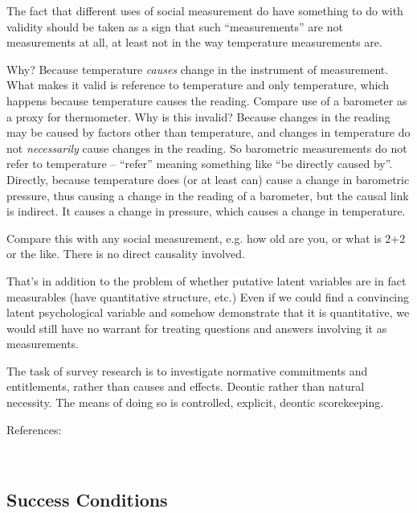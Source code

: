 \documentclass[11pt,twoside]{article}
\newcommand{\sr}{survey research}
\begin{document}
The fact that different uses of social measurement do have something
to do with validity should be taken as a sign that such
\enquote{measurements} are not measurements at all, at least not in
the way temperature measurements are.

Why?  Because temperature \textit{causes} change in the instrument of
measurement.  What makes it valid is reference to temperature and only
temperature, which happens because temperature causes the reading.
Compare use of a barometer as a proxy for thermometer.  Why is this
invalid?  Because changes in the reading may be caused by factors
other than temperature, and changes in temperature do not
\textit{necessarily} cause changes in the reading.  So barometric
measurements do not refer to temperature -- \enquote{refer} meaning
something like \enquote{be directly caused by}.  Directly, because
temperature does (or at least can) cause a change in barometric
pressure, thus causing a change in the reading of a barometer, but the
causal link is indirect.  It causes a change in pressure, which causes
a change in temperature.

Compare this with any social measurement, e.g. how old are you, or
what is 2+2 or the like.  There is no direct causality involved.

That's in addition to the problem of whether putative latent variables
are in fact measurables (have quantitative structure, etc.)  Even if
we could find a convincing latent psychological variable and somehow
demonstrate that it is quantitative, we would still have no warrant
for treating questions and answers involving it as measurements.

The task of \sr{} is to investigate normative commitments and
entitlements, rather than causes and effects.  Deontic rather than
natural necessity.  The means of doing so is controlled, explicit,
deontic scorekeeping.

References:

\noindent
\cite{messick_validity_1995}\\
\cite{hood_validity_2009}

\subsection{Success Conditions}
\end{document}
